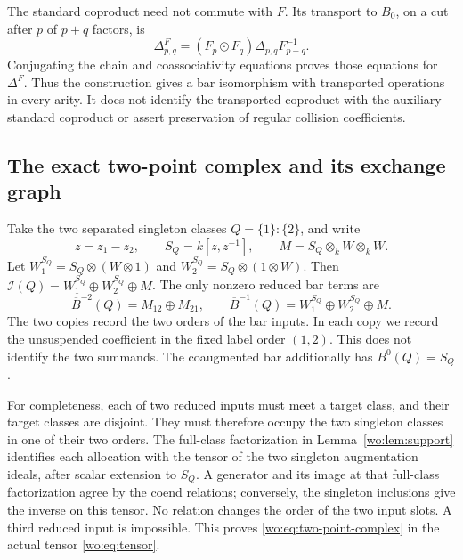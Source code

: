The standard coproduct need not commute with \(F\).  Its transport
to \(B_0\), on a cut after \(p\) of \(p+q\) factors, is
\begin{equation}\label{wo:eq:transported-cut}
 \Delta^F_{p,q}=(F_p\odot F_q)\Delta_{p,q}F_{p+q}^{-1}.
\end{equation}
Conjugating the chain and coassociativity equations proves those
equations for \(\Delta^F\).  Thus the construction gives a bar
isomorphism with transported operations in every arity.  It does
not identify the transported coproduct with the auxiliary standard
coproduct or assert preservation of regular collision coefficients.

\subsection{The exact two-point complex and its exchange graph}

Take the two separated singleton classes
\(Q=\{1\}:\{2\}\), and write
\[
 z=z_1-z_2,\qquad S_Q=k[z,z^{-1}],\qquad
 M=S_Q\otimes_k W\otimes_k W.
\]
Let \(W_1^{S_Q}=S_Q\otimes(W\otimes1)\) and
\(W_2^{S_Q}=S_Q\otimes(1\otimes W)\).  Then
\(\mathcal I(Q)=W_1^{S_Q}\oplus W_2^{S_Q}\oplus M\).
The only nonzero reduced bar terms are
\begin{equation}\label{wo:eq:two-point-complex}
 \overline B^{-2}(Q)=M_{12}\oplus M_{21},\qquad
 \overline B^{-1}(Q)=W_1^{S_Q}\oplus W_2^{S_Q}\oplus M.
\end{equation}
The two copies record the two orders of the bar inputs.  In each
copy we record the unsuspended coefficient in the fixed label order
\((1,2)\).  This does not identify the two summands.
The coaugmented bar additionally has \(B^0(Q)=S_Q\).

For completeness, each of two reduced inputs must meet a target
class, and their target classes are disjoint.  They must therefore
occupy the two singleton classes in one of their two orders.
The full-class factorization in Lemma~\ref{wo:lem:support} identifies
each allocation with the tensor of the two singleton augmentation
ideals, after scalar extension to \(S_Q\).  A generator and its
image at that full-class factorization agree by the coend relations;
conversely, the singleton inclusions give the inverse on this tensor.
No relation changes the order of the two input slots.  A third
reduced input is impossible.  This proves
\eqref{wo:eq:two-point-complex} in the actual tensor
\eqref{wo:eq:tensor}.


